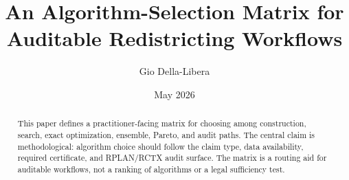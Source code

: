 \documentclass[12pt]{article}
\title{An Algorithm-Selection Matrix for Auditable Redistricting Workflows}
\author{Gio Della-Libera}
\date{May 2026}
\begin{document}
\maketitle

\begin{abstract}
This paper defines a practitioner-facing matrix for choosing among construction,
search, exact optimization, ensemble, Pareto, and audit paths. The central
claim is methodological: algorithm choice should follow the claim type, data
availability, required certificate, and RPLAN/RCTX audit surface. The matrix is
a routing aid for auditable workflows, not a ranking of algorithms or a legal
sufficiency test.
\end{abstract}







\nocite{bisect-u12-plan}


\end{document}
